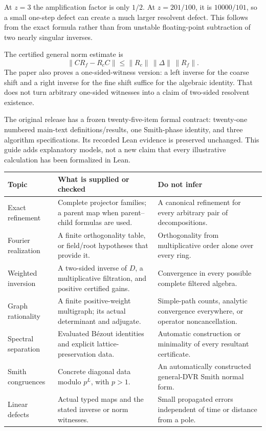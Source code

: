 At $z=3$ the amplification factor is only $1/2$. At $z=201/100$, it is $10000/101$, so a small one-step defect can create a much larger resolvent defect. This follows from the exact formula rather than from unstable floating-point subtraction of two nearly singular inverses.

The certified general norm estimate is
\[
\|CR_f-R_cC\|
\le \|R_c\|\,\|\Delta\|\,\|R_f\|.
\]
The paper also proves a one-sided-witness version: a left inverse for the coarse shift and a right inverse for the fine shift suffice for the algebraic identity. That does not turn arbitrary one-sided witnesses into a claim of two-sided resolvent existence.


The original release has a frozen twenty-five-item formal contract: twenty-one numbered main-text definitions/results, one Smith-phase identity, and three algorithm specifications. Its recorded Lean evidence is preserved unchanged. This guide adds explanatory models, not a new claim that every illustrative calculation has been formalized in Lean.

{\small
\begin{tabularx}{\linewidth}{@{}p{.28\linewidth}YY@{}}\toprule
\textbf{Topic} & \textbf{What is supplied or checked} & \textbf{Do not infer}\\\midrule
Exact refinement & Complete projector families; a parent map when parent--child formulas are used. & A canonical refinement for every arbitrary pair of decompositions.\\
Fourier realization & A finite orthogonality table, or field/root hypotheses that provide it. & Orthogonality from multiplicative order alone over every ring.\\
Weighted inversion & A two-sided inverse of $D$, a multiplicative filtration, and positive certified gains. & Convergence in every possible complete filtered algebra.\\
Graph rationality & A finite positive-weight multigraph; its actual determinant and adjugate. & Simple-path counts, analytic convergence everywhere, or operator noncancellation.\\
Spectral separation & Evaluated B\'ezout identities and explicit lattice-preservation data. & Automatic construction or minimality of every resultant certificate.\\
Smith congruences & Concrete diagonal data modulo $p^L$, with $p>1$. & An automatically constructed general-DVR Smith normal form.\\
Linear defects & Actual typed maps and the stated inverse or norm witnesses. & Small propagated errors independent of time or distance from a pole.\\\bottomrule
\end{tabularx}}


